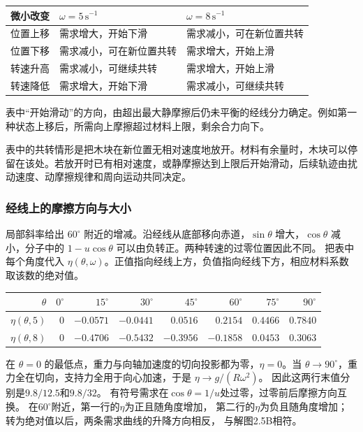 \documentclass[UTF8,fontset=fandol,a4paper,11pt]{ctexart}
\begin{document}
\begin{center}
\begin{tabular}{@{}lll@{}}\toprule
微小改变 & $\omega=5\,\mathrm{s^{-1}}$ & $\omega=8\,\mathrm{s^{-1}}$\\\midrule
位置上移 & 需求增大，开始下滑 & 需求减小，可在新位置共转\\
位置下移 & 需求减小，可在新位置共转 & 需求增大，开始上滑\\
转速升高 & 需求减小，可继续共转 & 需求增大，开始上滑\\
转速降低 & 需求增大，开始下滑 & 需求减小，可继续共转\\\bottomrule
\end{tabular}\end{center}
表中“开始滑动”的方向，由超出最大静摩擦后仍未平衡的经线分力确定。例如第一种状态上移后，所需向上摩擦超过材料上限，剩余合力向下。

表中的共转情形是把木块在新位置无相对速度地放开。材料有余量时，木块可以停留在该处。若放开时已有相对速度，或静摩擦达到上限后开始滑动，后续轨迹由扰动速度、动摩擦规律和周向运动共同决定。
\subsubsection*{经线上的摩擦方向与大小}
局部斜率给出 $60^\circ$ 附近的增减。沿经线从底部移向赤道，$\sin\theta$ 增大，$\cos\theta$ 减小，分子中的 $1-u\cos\theta$ 可以由负转正。两种转速的过零位置因此不同。
把表中每个角度代入 $\eta(\theta,\omega)$。正值指向经线上方，负值指向经线下方，相应材料系数取该数的绝对值。
\begin{center}
\begin{tabular}{@{}rrrrrrrr@{}}\toprule
$\theta$ & $0^\circ$ & $15^\circ$ & $30^\circ$ & $45^\circ$ & $60^\circ$ & $75^\circ$ & $90^\circ$\\\midrule
$\eta(\theta,5)$ & 0 & $-0.0571$ & $-0.0441$ & $0.0516$ & $0.2154$ & $0.4466$ & $0.7840$\\
$\eta(\theta,8)$ & 0 & $-0.4706$ & $-0.5432$ & $-0.3956$ & $-0.1858$ & $0.0453$ & $0.3063$\\\bottomrule
\end{tabular}
\end{center}
在 $\theta=0$ 的最低点，重力与向轴加速度的切向投影都为零，$\eta=0$。当 $\theta\to90^\circ$，重力全在切向，支持力全用于向心加速，于是 $\eta\to g/(R\omega^2)$。
因此这两行末值分别是$9.8/12.5$和$9.8/32$。
有符号需求在$\cos\theta=1/u$处过零，过零前后摩擦方向互换。
在$60^\circ$附近，第一行的$\eta$为正且随角度增加，
第二行的$\eta$为负且随角度增加；转为绝对值以后，两条需求曲线的升降方向相反，
与解图2.5B相符。
\end{document}
